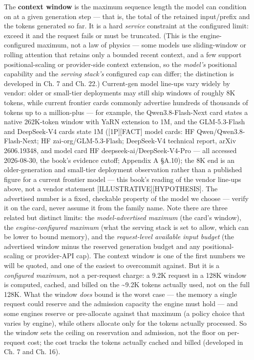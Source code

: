 The \textbf{context window} is the maximum sequence length the model can
condition on at a given generation step --- that is, the total of the
retained input/prefix and the tokens generated so far. It is a hard
\emph{service} constraint at the configured limit: exceed it and the
request fails or must be truncated. (This is the engine-configured
maximum, not a law of physics --- some models use sliding-window or
rolling attention that retains only a bounded recent context, and a few
support positional-scaling or provider-side context extension, so the
\emph{model's} positional capability and the \emph{serving stack's}
configured cap can differ; the distinction is developed in Ch. 7 and Ch.
22.) Current-gen model line-ups vary widely by vendor: older or
small-tier deployments may still ship windows of roughly 8K tokens,
while current frontier cards commonly advertise hundreds of thousands of
tokens up to a million-plus --- for example, the Qwen3.8-Flash-Next card
states a native 262K-token window with YaRN extension to 1M, and the
GLM-5.3-Flash and DeepSeek-V4 cards state 1M (\mbox{{[}1P{]}}\hspace{0pt}\mbox{{[}FACT{]}} model
cards: HF Qwen/Qwen3.8-Flash-Next; HF zai-org/GLM-5.3-Flash; DeepSeek-V4
technical report, arXiv 2606.19348, and model card HF
deepseek-ai/DeepSeek-V4-Pro --- all accessed 2026-08-30, the book's
evidence cutoff; Appendix A §A.10); the 8K end is an older-generation
and small-tier deployment observation rather than a published figure for
a current frontier model --- this book's reading of the vendor line-ups
above, not a vendor statement \mbox{{[}ILLUSTRATIVE{]}}\hspace{0pt}\mbox{{[}HYPOTHESIS{]}}. The
advertised number is a fixed, checkable property of the model we choose
--- verify it on the card, never assume it from the family name. Note
there are three related but distinct limits: the \emph{model-advertised
maximum} (the card's window), the \emph{engine-configured maximum} (what
the serving stack is set to allow, which can be lower to bound memory),
and the \emph{request-level available input budget} (the advertised
window minus the reserved generation budget and any positional-scaling
or provider-API cap). The context window is one of the first numbers we
will be quoted, and one of the easiest to overcommit against. But it is
a \emph{configured maximum}, not a per-request charge: a 9.2K request in
a 128K window is computed, cached, and billed on the \textasciitilde9.2K
tokens actually used, not on the full 128K. What the window \emph{does}
bound is the worst case --- the memory a single request could reserve
and the admission capacity the engine must hold --- and some engines
reserve or pre-allocate against that maximum (a policy choice that
varies by engine), while others allocate only for the tokens actually
processed. So the window sets the ceiling on reservation and admission,
not the floor on per-request cost; the cost tracks the tokens actually
cached and billed (developed in Ch. 7 and Ch. 16).

